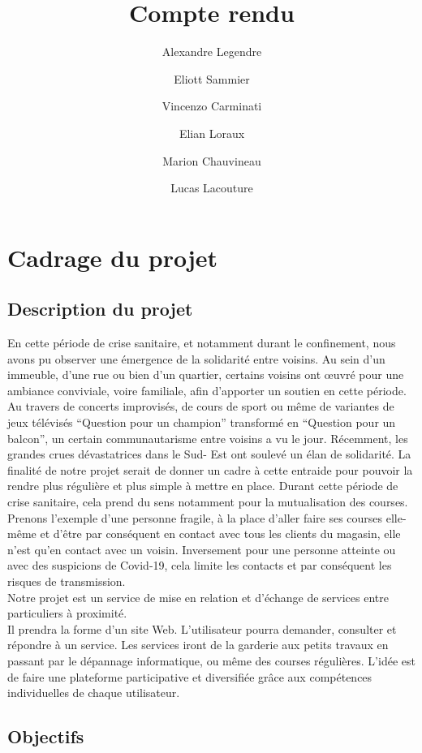 \documentclass[a4paper,11pt]{article}
\title{Compte rendu}
\author{
  Alexandre Legendre\\
  \and
  Eliott Sammier\\
  \and
  Vincenzo Carminati\\
  \and
  Elian Loraux\\
  \and
  Marion Chauvineau\\
  \and
  Lucas Lacouture\\
}
\begin{document}
\newpage
\tableofcontents
\newpage

\section{Cadrage du projet}
\subsection{Description du projet}
En cette période de crise sanitaire, et notamment durant le confinement, nous avons pu observer une
émergence de la solidarité entre voisins. Au sein d’un immeuble, d’une rue ou bien d’un quartier,
certains voisins ont œuvré pour une ambiance conviviale, voire familiale, afin d’apporter un soutien en
cette période. Au travers de concerts improvisés, de cours de sport ou même de variantes de jeux
télévisés “Question pour un champion” transformé en “Question pour un balcon”, un certain
communautarisme entre voisins a vu le jour. Récemment, les grandes crues dévastatrices dans le Sud-
Est ont soulevé un élan de solidarité. La finalité de notre projet serait de donner un cadre à cette
entraide pour pouvoir la rendre plus régulière et plus simple à mettre en place.
Durant cette période de crise sanitaire, cela prend du sens notamment pour la mutualisation des
courses. Prenons l’exemple d’une personne fragile, à la place d’aller faire ses courses elle-même et
d’être par conséquent en contact avec tous les clients du magasin, elle n’est qu’en contact avec un
voisin. Inversement pour une personne atteinte ou avec des suspicions de Covid-19, cela limite les
contacts et par conséquent les risques de transmission.\\

Notre projet est un service de mise en relation et d’échange de services entre particuliers à proximité.\\

Il prendra la forme d’un site Web. L’utilisateur pourra demander, consulter et répondre à un service.
Les services iront de la garderie aux petits travaux en passant par le dépannage informatique, ou
même des courses régulières. L’idée est de faire une plateforme participative et diversifiée grâce aux
compétences individuelles de chaque utilisateur.\\


\subsection{Objectifs}
\end{document}
